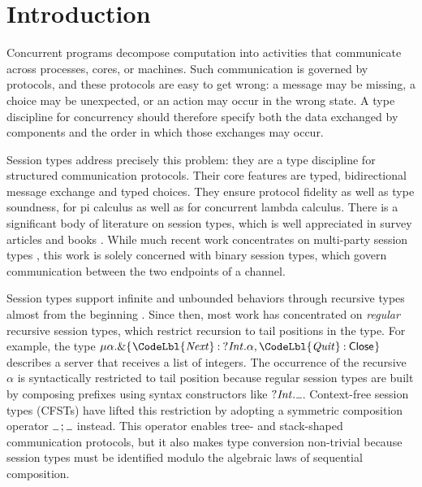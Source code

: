 \newcommand\linenoreset[1][1]{%
  \defcounter{lineno@num}{#1 - 1}%
}

\EndFmtInput














\section{Introduction}
\label{sec:introduction}

Concurrent programs decompose computation into activities that
communicate across processes, cores, or machines. Such communication is
governed by protocols, and these protocols are easy to get wrong: a
message may be missing, a choice may be unexpected, or an action may
occur in the wrong state. A type discipline for concurrency should
therefore specify both the data exchanged by components and the order
in which those exchanges may occur.

Session types
\cite{DBLP:conf/concur/Honda93,HondaVK98,Gay_Vasconcelos_2025}
address precisely this problem: they are a type discipline for
structured communication
protocols. Their core features are typed, bidirectional message
exchange and typed choices. They ensure protocol fidelity as well as type soundness,
for pi calculus as well as for concurrent lambda calculus. There is a significant body of
literature on session types, which is well appreciated in
survey articles and books
\cite{DBLP:journals/csur/HuttelLVCCDMPRT16,
  gay17:_behav_types,
  DBLP:journals/ftpl/AnconaBB0CDGGGH16,
  Gay_Vasconcelos_2025}.
While much recent work concentrates on multi-party session types
\cite{DBLP:journals/jacm/HondaYC16}, this work is solely concerned
with binary session types, which govern communication between the two endpoints
of a channel.

Session types support infinite and unbounded behaviors through
recursive types almost from the beginning \cite{HondaVK98}. Since
then, most work has concentrated on \emph{regular} recursive session
types, which restrict recursion to tail positions in the
type. For example, the type
\ensuremath{\mu  \alpha .\&\{\mkern1mu\relax \CodeLbl{\Conid{Next}}\mathbin{:}\mathord{?}\Conid{Int}.\alpha ,\CodeLbl{\Conid{Quit}}\mathbin{:}\CodeTy{Close}\mkern1mu\}}
describes a server that receives a list of integers. The occurrence of
the recursive \ensuremath{\alpha } is syntactically restricted to tail
position because regular session types are built by composing prefixes
using syntax constructors like \ensuremath{\mathord{?}\Conid{Int}.\anonymous }. Context-free session types
\cite{DBLP:conf/icfp/ThiemannV16,DBLP:journals/iandc/AlmeidaMTV22,DBLP:journals/toplas/Padovani19} (CFSTs)
have lifted this restriction by adopting a symmetric composition
operator \ensuremath{\anonymous \mathop{;}\anonymous } instead. This operator
enables tree- and stack-shaped communication protocols, but it also
makes type conversion non-trivial because session types must be
identified modulo the algebraic laws of sequential composition.

